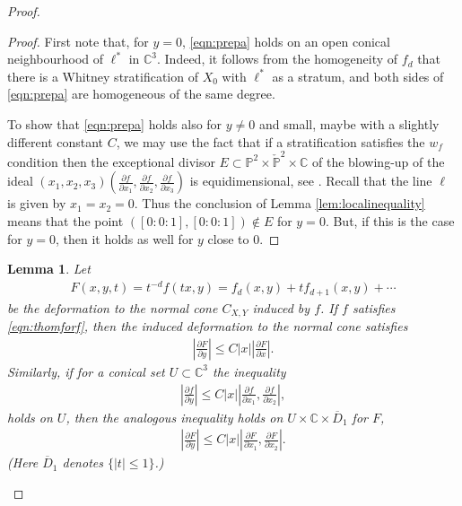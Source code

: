 \documentclass[12pt]{amsart}
\newtheorem{lemma}[theorem]{Lemma}
\theoremstyle{definition}
\numberwithin{equation}{section}
\newcommand{\C}{\mathbb{C}}
\begin{document}
\begin{proof}
\begin{proof}
 First note that, for $y=0$, \eqref{eqn:prepa} holds on an open conical neighbourhood of $\ell^*$ in 
 $\C^3$. Indeed, it follows from the homogeneity of $f_d$ that there is a Whitney stratification of $X_0$ with $\ell^*$ as a stratum, and both sides of \eqref{eqn:prepa} are homogeneous of the same degree.  

To show that \eqref{eqn:prepa} holds also for $y\ne 0$ and small, maybe with a slightly different constant $C$, we may use the fact that if 
a stratification satisfies  the $w_f$ condition then the exceptional divisor $E\subset {\mathbb P}^2\times \check{\mathbb P}^2\times \mathbb C$ of the blowing-up of the ideal $(x_1,x_2,x_3)(\frac{\partial f}{\partial x_1}, \frac{\partial f}{\partial x_2},  \frac{\partial f}{\partial x_3})$  
 is equidimensional, see  \cite[Proposition 3.3.1, Théorème 6.1, and Remarque 6.2.1]{HMS84}. Recall that the line $\ell$ is given by $x_1=x_2=0$.  Thus the conclusion of Lemma \ref{lem:localinequality} means that 
  the point $([0:0:1],[0:0:1]) \notin E$ for $y=0$.  But, if this is the case for $y=0$, then it holds as well for $y$ close to $0$.  
 \end{proof}

 \begin{lemma}\label{lem:observation}
Let  
\begin{align*}
F(x,y,t)=t^{-d}f(tx,y) = f_d(x,y) + t f_{d+1}(x,y) + \cdots 
\end{align*}
 be the deformation to the normal cone $C_{X,Y}$ induced by $f$. 
If $f$ satisfies \eqref{eqn:thomforf}, then the induced deformation  to the normal cone satisfies  
\begin{align}\label{eqn:thomforF}
\left|\frac{\partial F}{\partial y}\right|\leq C|x| \left|\frac{\partial F}{\partial x}\right|.
\end{align}
Similarly, if for a conical set $U\subset \C^3$ the inequality  
\begin{align}\label{eqn:thomforf2}
\left|\frac{\partial f}{\partial y}\right|\leq C|x| \left|\frac{\partial f}{\partial x_1}, \frac{\partial f}{\partial x_2} \right| ,
\end{align}
holds on $U$,  then the analogous inequality holds on $U\times\C\times 
\overline D_1$ for $F$,   
\begin{align}\label{eqn:thomforF2}
\left|\frac{\partial F}{\partial y}\right|\leq C|x| \left|\frac{\partial F}{\partial x_1}, \frac{\partial F}{\partial x_2} \right|.
\end{align}
(Here $\overline D_1$ denotes $\{|t|\le 1\}$.)
\end{lemma}


\end{proof}
\end{document}

